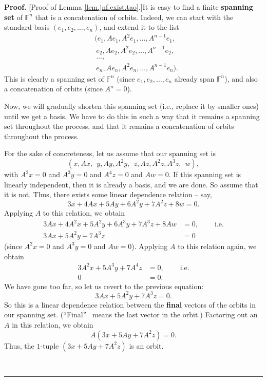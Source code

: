 \documentclass[numbers=enddot,12pt,final,onecolumn,notitlepage]{scrartcl}%
\numberwithin{exer}{subsection}
\theoremstyle{definition}
\newenvironment{proof}[1][Proof]{\noindent\textbf{#1.} }{\ \rule{0.5em}{0.5em}}
\begin{document}
\begin{proof}
[Proof of Lemma \ref{lem.jnf.exist.tao}.]It is easy to find a finite
\textbf{spanning set} of $\mathbb{F}^{n}$ that is a concatenation of orbits.
Indeed, we can start with the standard basis $\left(  e_{1},e_{2},\ldots
,e_{n}\right)  $, and extend it to the list%
\begin{align*}
&  (e_{1},Ae_{1},A^{2}e_{1},\ldots,A^{n-1}e_{1},\\
&  \ e_{2},Ae_{2},A^{2}e_{2},\ldots,A^{n-1}e_{2},\\
&  \ \ldots,\\
&  \ e_{n},Ae_{n},A^{2}e_{n},\ldots,A^{n-1}e_{n}).
\end{align*}
This is clearly a spanning set of $\mathbb{F}^{n}$ (since $e_{1},e_{2}%
,\ldots,e_{n}$ already span $\mathbb{F}^{n}$), and also a concatenation of
orbits (since $A^{n}=0$).

Now, we will gradually shorten this spanning set (i.e., replace it by smaller
ones) until we get a basis. We have to do this in such a way that it remains a
spanning set throughout the process, and that it remains a concatenation of
orbits throughout the process.

For the sake of concreteness, let us assume that our spanning set is%
\[
\left(  x,Ax,\ \ y,Ay,A^{2}y,\ \ z,Az,A^{2}z,A^{3}z,\ \ w\right)  ,
\]
with $A^{2}x=0$ and $A^{3}y=0$ and $A^{4}z=0$ and $Aw=0$. If this spanning set
is linearly independent, then it is already a basis, and we are done. So
assume that it is not. Thus, there exists some linear dependence relation --
say,%
\[
3x+4Ax+5Ay+6A^{2}y+7A^{2}z+8w=0.
\]
Applying $A$ to this relation, we obtain%
\begin{align*}
3Ax+4A^{2}x+5A^{2}y+6A^{3}y+7A^{3}z+8Aw  &  =0,\ \ \ \ \ \ \ \ \ \ \text{i.e.}%
\\
3Ax+5A^{2}y+7A^{3}z  &  =0
\end{align*}
(since $A^{2}x=0$ and $A^{3}y=0$ and $Aw=0$). Applying $A$ to this relation
again, we obtain%
\begin{align*}
3A^{2}x+5A^{3}y+7A^{4}z  &  =0,\ \ \ \ \ \ \ \ \ \ \text{i.e.}\\
0  &  =0.
\end{align*}
We have gone too far, so let us revert to the previous equation:%
\[
3Ax+5A^{2}y+7A^{3}z=0.
\]
So this is a linear dependence relation between the \textbf{final} vectors of
the orbits in our spanning set. (\textquotedblleft Final\textquotedblright%
\ means the last vector in the orbit.) Factoring out an $A$ in this relation,
we obtain%
\[
A\left(  3x+5Ay+7A^{2}z\right)  =0.
\]
Thus, the $1$-tuple $\left(  3x+5Ay+7A^{2}z\right)  $ is an orbit.


\end{proof}
\end{document}
